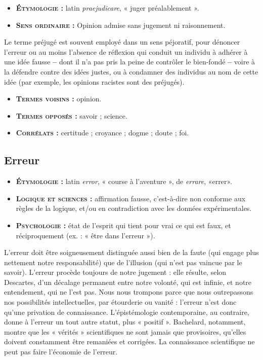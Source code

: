 {\footnotesize
\begin{itemize}[leftmargin=1cm, label=, itemsep=1pt]
\item {\bf \textsc{Étymologie} :} latin {\it praejudicare},
« juger préalablement ».
\item {\bf \textsc{Sens ordinaire} :} Opinion admise sans
jugement ni raisonnement.
\end{itemize}
}

Le terme préjugé est souvent employé
dans un sens péjoratif, pour dénoncer
l'erreur ou au moins l'absence de
réflexion qui conduit un individu à
adhérer à une idée fausse {\bf --} dont il n’a
pas pris la peine de contrôler le bien-fondé {\bf --}
voire à la défendre contre des
idées justes, ou à condamner des individus
au nom de cette idée (par
exemple, les opinions racistes sont des
préjugés).

{\footnotesize
\begin{itemize}[leftmargin=1cm, label=, itemsep=1pt]
\item {\bf \textsc{Termes voisins} :} opinion.
\item {\bf \textsc{Termes opposés} :} savoir ; science.
\item {\bf \textsc{Corrélats} :} certitude ; croyance ;
dogme ; doute ; foi.
\end{itemize}
}

  

\subsection{Erreur}

{\footnotesize
\begin{itemize}[leftmargin=1cm, label=, itemsep=1pt]
\item {\bf \textsc{Étymologie} :} latin {\it error}, « course
à l'aventure », de {\it errare}, «errer».
\item {\bf \textsc{Logique et sciences} :} affirmation
fausse, c'est-à-dire non conforme
aux règles de la logique, et/ou en
contradiction avec les données
expérimentales.
\item {\bf \textsc{Psychologie} :} état
de l'esprit qui tient pour vrai ce
qui est faux, et réciproquement
(ex. : « être dans l’erreur »).
\end{itemize}
}

L'erreur doit être soigneusement distinguée
aussi bien de la faute (qui engage
plus nettement notre responsabilité) que
de l’illusion (qui n’est pas vaincue par
le savoir). L'erreur procède toujours de
notre jugement : elle résulte, selon Descartes,
d’un décalage permanent entre
notre volonté, qui est infinie, et notre
entendement, qui ne l'est pas. Nous
nous trompons parce que nous outrepassons
nos possibilités intellectuelles,
par étourderie ou vanité : l'erreur n’est
donc qu'une privation de connaissance.
L'épistémologie contemporaine, au
contraire, donne à l’erreur un tout autre
statut, plus « positif ». Bachelard, notamment,
montre que les « vérités » scientifiques
ne sont jamais que provisoires,
qu'elles doivent constamment être remaniées
et corrigées. La connaissance
scientifique ne peut pas faire l'économie
de l’erreur.

